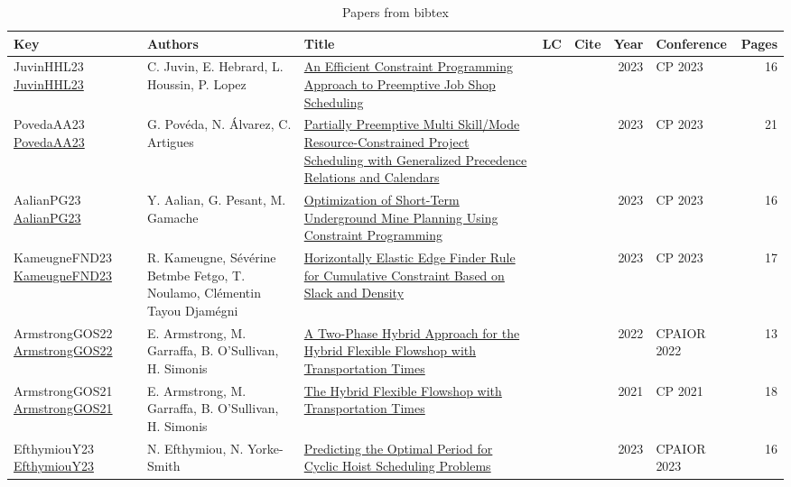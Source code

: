 {\scriptsize
\begin{longtable}{p{3cm}p{6cm}p{7cm}rrrp{3cm}r}
\caption{Papers from bibtex}\\ \toprule
Key& Authors & Title & LC &Cite & Year & Conference & Pages \\ \midrule\endhead
\bottomrule
\endfoot
JuvinHHL23 \href{https://doi.org/10.4230/LIPIcs.CP.2023.19}{JuvinHHL23} & C. Juvin, E. Hebrard, L. Houssin, P. Lopez & \href{papers/JuvinHHL23.pdf}{An Efficient Constraint Programming Approach to Preemptive Job Shop Scheduling} &  & \cite{JuvinHHL23} & 2023 & CP 2023 & 16\\
PovedaAA23 \href{https://doi.org/10.4230/LIPIcs.CP.2023.31}{PovedaAA23} & G. Pov{\'{e}}da, N. {\'{A}}lvarez, C. Artigues & \href{papers/PovedaAA23.pdf}{Partially Preemptive Multi Skill/Mode Resource-Constrained Project Scheduling with Generalized Precedence Relations and Calendars} &  & \cite{PovedaAA23} & 2023 & CP 2023 & 21\\
AalianPG23 \href{https://doi.org/10.4230/LIPIcs.CP.2023.6}{AalianPG23} & Y. Aalian, G. Pesant, M. Gamache & \href{papers/AalianPG23.pdf}{Optimization of Short-Term Underground Mine Planning Using Constraint Programming} &  & \cite{AalianPG23} & 2023 & CP 2023 & 16\\
KameugneFND23 \href{https://doi.org/10.4230/LIPIcs.CP.2023.20}{KameugneFND23} & R. Kameugne, S{\'{e}}v{\'{e}}rine Betmbe Fetgo, T. Noulamo, Cl{\'{e}}mentin Tayou Djam{\'{e}}gni & \href{papers/KameugneFND23.pdf}{Horizontally Elastic Edge Finder Rule for Cumulative Constraint Based on Slack and Density} &  & \cite{KameugneFND23} & 2023 & CP 2023 & 17\\
ArmstrongGOS22 \href{https://doi.org/10.1007/978-3-031-08011-1\_1}{ArmstrongGOS22} & E. Armstrong, M. Garraffa, B. O'Sullivan, H. Simonis & \href{papers/ArmstrongGOS22.pdf}{A Two-Phase Hybrid Approach for the Hybrid Flexible Flowshop with Transportation Times} &  & \cite{ArmstrongGOS22} & 2022 & CPAIOR 2022 & 13\\
ArmstrongGOS21 \href{https://doi.org/10.4230/LIPIcs.CP.2021.16}{ArmstrongGOS21} & E. Armstrong, M. Garraffa, B. O'Sullivan, H. Simonis & \href{papers/ArmstrongGOS21.pdf}{The Hybrid Flexible Flowshop with Transportation Times} &  & \cite{ArmstrongGOS21} & 2021 & CP 2021 & 18\\
EfthymiouY23 \href{https://doi.org/10.1007/978-3-031-33271-5\_16}{EfthymiouY23} & N. Efthymiou, N. Yorke{-}Smith & \href{papers/EfthymiouY23.pdf}{Predicting the Optimal Period for Cyclic Hoist Scheduling Problems} &  & \cite{EfthymiouY23} & 2023 & CPAIOR 2023 & 16\\

\end{longtable}}
